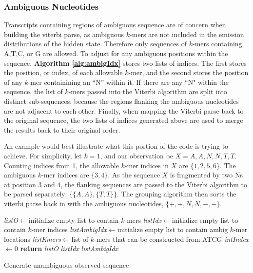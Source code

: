 \subsubsection{Ambiguous Nucleotides}
Transcripts containing regions of ambiguous sequence are of concern when building the viterbi parse, as ambiguous $k$-mers are not included in the emission distributions of the hidden state. Therefore only sequences of $k$-mers containing A,T,C, or G are allowed. To adjust for any ambiguous positions within the sequence, \textbf{Algorithm \ref{alg:ambigIdx}} stores two lists of indices. The first stores the position, or index, of each allowable $k$-mer, and the second stores the position of any $k$-mer containining an ``N'' within it. If there are any ``N" within the sequence, the list of $k$-mers passed into the Viterbi algorithm are split into distinct sub-sequences, because the regions flanking the ambiguous nucleotides are not adjacent to each other. Finally, when mapping the Viterbi parse back to the original sequence, the two lists of indices generated above are used to merge the results back to their original order.

An example would best illustrate what this portion of the code is trying to achieve. For simplicity, let $k=1$, and our observation be $X= A,A,N,N,T,T$. Counting indices from 1, the allowable $k$-mer indices in $X$ are $\{1,2,5,6\}$. The ambiguous $k$-mer indices are $\{3,4\}$. As the sequence $X$ is fragmented by two Ns at position 3 and 4, the flanking sequences are passed to the Viterbi algorithm to be parsed separately: $\{\{A,A\},\{T,T\}\}$. The grouping algorithm then sorts the viterbi parse back in with the ambiguous nucleotides, $\{+,+,N,N,-,-\}$.

\begin{algorithm}[h]
\DontPrintSemicolon
{}
\SetAlgoLined
{}
\emph{listO}$\leftarrow$initialize empty list to contain $k$-mers\;
\emph{listIdx}$\leftarrow$initialize empty list to contain $k$-mer indices\;
\emph{listAmbigIdx}$\leftarrow$initialize empty list to contain ambig $k$-mer locations\;
\emph{listKmers}$\leftarrow$list of $k$-mers that can be constructed from ATCG\;
\emph{intIndex}$\leftarrow$0\;
 \textbf{return} \emph{listO} \emph{listIdx} \emph{listAmbigIdx}\;
 \caption{Generate unambiguous observed sequence}
 \label{alg:ambigIdx}
\end{algorithm}
